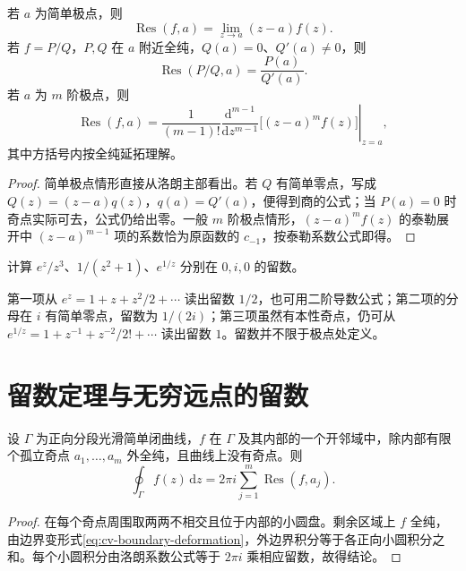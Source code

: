 \documentclass[UTF8,12pt,a4paper,fontset=fandol]{ctexbook}
\begin{document}
\begin{proposition}[常用留数公式]
\label{prop:cv-residue-formula}
若 $a$ 为简单极点，则
\[
 \operatorname{Res}(f,a)=\lim_{z\to a}(z-a)f(z).
\]
若 $f=P/Q$，$P,Q$ 在 $a$ 附近全纯，$Q(a)=0$、$Q'(a)\ne0$，则
\begin{equation}
 \operatorname{Res}(P/Q,a)=\frac{P(a)}{Q'(a)}.
 \label{eq:cv-simple-residue}
\end{equation}
若 $a$ 为 $m$ 阶极点，则
\begin{equation}
 \operatorname{Res}(f,a)=\frac1{(m-1)!}
 \left.\frac{\mathrm d^{m-1}}{\mathrm dz^{m-1}}
 \bigl[(z-a)^mf(z)\bigr]\right|_{z=a},
 \label{eq:cv-pole-residue}
\end{equation}
其中方括号内按全纯延拓理解。
\end{proposition}
\begin{proof}
简单极点情形直接从洛朗主部看出。若 $Q$ 有简单零点，写成 $Q(z)=(z-a)q(z)$，$q(a)=Q'(a)$，便得到商的公式；当 $P(a)=0$ 时奇点实际可去，公式仍给出零。一般 $m$ 阶极点情形，$(z-a)^mf(z)$ 的泰勒展开中 $(z-a)^{m-1}$ 项的系数恰为原函数的 $c_{-1}$，按泰勒系数公式即得。
\end{proof}

\begin{example}[选用最短的计算途径]
计算 $e^z/z^3$、$1/(z^2+1)$、$e^{1/z}$ 分别在 $0,i,0$ 的留数。
\end{example}
\begin{solve}
第一项从 $e^z=1+z+z^2/2+\cdots$ 读出留数 $1/2$，也可用二阶导数公式；第二项的分母在 $i$ 有简单零点，留数为 $1/(2i)$；第三项虽然有本性奇点，仍可从 $e^{1/z}=1+z^{-1}+z^{-2}/2!+\cdots$ 读出留数 $1$。留数并不限于极点处定义。
\end{solve}

\section{留数定理与无穷远点的留数}

\begin{theorem}[留数定理]
\label{thm:cv-residue}
设 $\Gamma$ 为正向分段光滑简单闭曲线，$f$ 在 $\Gamma$ 及其内部的一个开邻域中，除内部有限个孤立奇点 $a_1,\ldots,a_m$ 外全纯，且曲线上没有奇点。则
\begin{equation}
 \oint_\Gamma f(z)\,\mathrm dz
 =2\pi i\sum_{j=1}^m\operatorname{Res}(f,a_j).
 \label{eq:cv-residue-theorem}
\end{equation}
\end{theorem}
\begin{proof}
在每个奇点周围取两两不相交且位于内部的小圆盘。剩余区域上 $f$ 全纯，由边界变形式\eqref{eq:cv-boundary-deformation}，外边界积分等于各正向小圆积分之和。每个小圆积分由洛朗系数公式等于 $2\pi i$ 乘相应留数，故得结论。
\end{proof}
\end{document}
